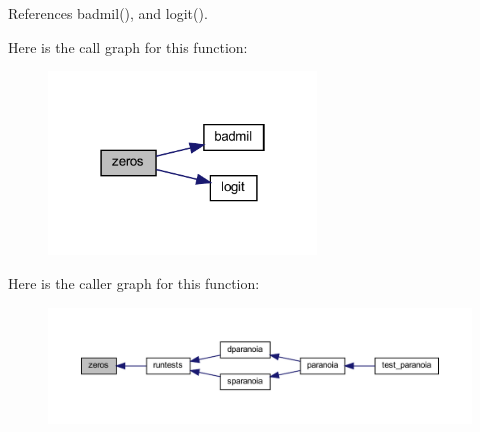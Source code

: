 References badmil(), and logit().

Here is the call graph for this function\+:
\nopagebreak
\begin{figure}[H]
\begin{center}
\leavevmode
\includegraphics[width=202pt]{dparanoia_8f90_aa950201dedb2112e97b67e9fae35f88e_cgraph}
\end{center}
\end{figure}
Here is the caller graph for this function\+:
\nopagebreak
\begin{figure}[H]
\begin{center}
\leavevmode
\includegraphics[width=350pt]{dparanoia_8f90_aa950201dedb2112e97b67e9fae35f88e_icgraph}
\end{center}
\end{figure}

